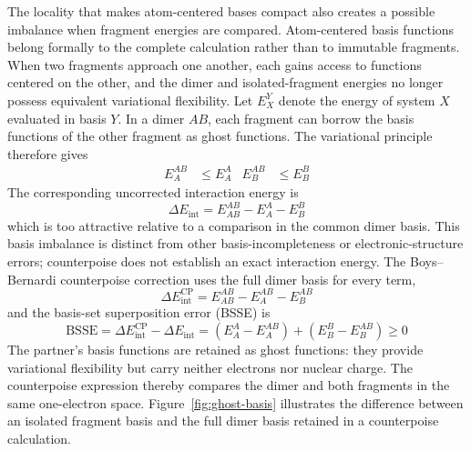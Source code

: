 \hfBioBernardi

The locality that makes atom-centered bases compact also creates a possible
imbalance when fragment energies are compared. Atom-centered basis functions
belong formally to the complete calculation
rather than to immutable fragments. When two fragments approach one another,
each gains access to functions centered on the other, and the dimer and
isolated-fragment energies no longer possess equivalent variational
flexibility.
Let $E_X^Y$ denote the energy of system $X$ evaluated in basis $Y$. In a
dimer $AB$, each fragment can borrow the basis functions of the other fragment
as ghost functions. The variational principle therefore gives
\begin{align}
  E_A^{AB}&\leq E_A^A
  &
  E_B^{AB}&\leq E_B^B
\end{align}
The corresponding uncorrected interaction energy is
\begin{equation}
  \Delta E_\text{int}=E_{AB}^{AB}-E_A^A-E_B^B
\end{equation}
which is too attractive relative to a comparison in the common dimer basis.
This basis imbalance is distinct from other basis-incompleteness or
electronic-structure errors; counterpoise does not establish an exact
interaction energy. The Boys--Bernardi counterpoise correction
\citep{BoysBernardi1970} uses
the full dimer basis for every term,
\begin{equation}
  \boxed{
  \Delta E_\text{int}^\text{CP}
  =E_{AB}^{AB}-E_A^{AB}-E_B^{AB}
  }
\end{equation}
and the basis-set superposition error (BSSE) is
\begin{equation}
  \mathrm{BSSE}
  =\Delta E_\text{int}^\text{CP}-\Delta E_\text{int}
  =(E_A^A-E_A^{AB})+(E_B^B-E_B^{AB})\geq0
\end{equation}
The partner's basis functions are retained as ghost functions: they provide
variational flexibility but carry neither electrons nor nuclear charge. The
counterpoise expression thereby compares the dimer and both fragments in the
same one-electron space.
Figure~\ref{fig:ghost-basis} illustrates the difference between an isolated
fragment basis and the full dimer basis retained in a counterpoise calculation.

